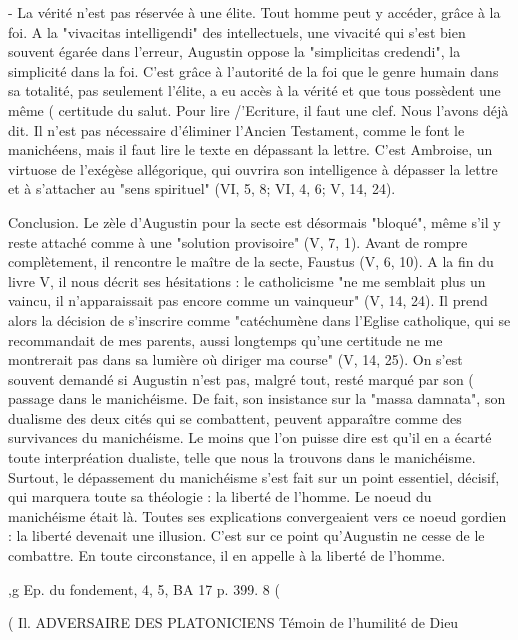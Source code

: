 -	La vérité n'est pas réservée à une élite. Tout homme peut y accéder, grâce à la foi.  A la "vivacitas intelligendi" des intellectuels, une vivacité qui s'est bien souvent égarée dans l'erreur, Augustin oppose la "simplicitas credendi", la simplicité dans la foi. C'est grâce à l'autorité de la foi que le genre humain dans sa totalité, pas seulement l'élite, a eu accès à la vérité et que tous possèdent une même
(	certitude du salut.
Pour lire /'Ecriture, il faut une clef. Nous l'avons déjà dit. Il n'est pas nécessaire d'éliminer l'Ancien Testament, comme le font le manichéens, mais il faut lire le texte en dépassant la lettre. C'est Ambroise, un virtuose de l'exégèse allégorique, qui ouvrira son intelligence à dépasser la lettre et à s'attacher au "sens spirituel" (VI, 5, 8;  VI, 4, 6; V, 14, 24).

Conclusion. Le zèle d'Augustin pour la secte est désormais "bloqué", même s'il y reste attaché comme à une "solution provisoire" (V, 7, 1). Avant de rompre complètement, il rencontre le maître de la secte, Faustus (V, 6, 10). A la fin du livre V, il nous décrit ses hésitations : le catholicisme "ne me semblait plus un vaincu, il n'apparaissait pas encore comme un vainqueur" (V, 14, 24). Il prend alors la décision de s'inscrire comme "catéchumène dans l'Eglise catholique, qui se recommandait de mes parents, aussi longtemps qu'une certitude ne me montrerait pas dans sa lumière où diriger ma course" (V, 14, 25).
On s'est souvent demandé si Augustin n'est pas, malgré tout, resté marqué par son	(
passage dans le manichéisme. De fait, son insistance sur la "massa damnata", son
dualisme des deux cités qui se combattent, peuvent apparaître comme des survivances du manichéisme. Le moins que l'on puisse dire est qu'il en a écarté toute interpréation dualiste, telle que nous la trouvons dans le manichéisme. Surtout, le dépassement du manichéisme s'est fait sur un point essentiel, décisif, qui marquera toute sa théologie : la liberté de l'homme. Le noeud du manichéisme était là. Toutes ses explications convergeaient vers ce noeud gordien : la liberté devenait une illusion. C'est sur ce point qu'Augustin ne cesse de le combattre. En toute circonstance, il en appelle à la liberté de l'homme.






,g  Ep. du fondement, 4, 5, BA 17 p. 399.
8
(
 
(
Il.	ADVERSAIRE	DES PLATONICIENS
Témoin  de l'humilité  de Dieu

